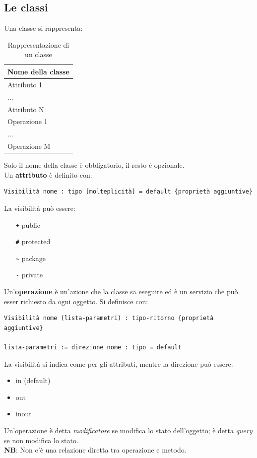 \subsection{Le classi}
Una classe si rappresenta:
\begin{table}[H]
\centering
\begin{tabular}{|l|}
\hline
\textbf{Nome della classe} \\
\hline
Attributo 1 \\
... \\
Attributo N \\
\hline
Operazione 1 \\
... \\
Operazione M \\
\hline
\end{tabular}
\caption{Rappresentazione di un classe}
\end{table}
Solo il nome della classe è obbligatorio, il resto è opzionale. \\
Un \textbf{attributo} è definito con:
\begin{verbatim}
Visibilità nome : tipo [molteplicità] = default {proprietà aggiuntive}
\end{verbatim}
La visibilità può essere:
\begin{itemize}
\item[\texttt{+}] public
\item[\texttt{\#}] protected
\item[\texttt{\textasciitilde}] package
\item[\texttt{-}] private
\end{itemize}
Un'\textbf{operazione} è un'azione che la classe sa eseguire ed è un servizio che può esser richiesto da ogni oggetto. Si definisce con:
\begin{verbatim}
Visibilità nome (lista-parametri) : tipo-ritorno {proprietà aggiuntive}

lista-parametri := direzione nome : tipo = default
\end{verbatim}
La visibilità si indica come per gli attributi, mentre la direzione può essere:
\begin{itemize}
\item in (default)
\item out
\item inout
\end{itemize}
Un'operazione è detta \textit{modificatore} se modifica lo stato dell'oggetto; è detta \textit{query} se non modifica lo stato. \\
\textbf{NB}: Non c'è una relazione diretta tra operazione e metodo.

